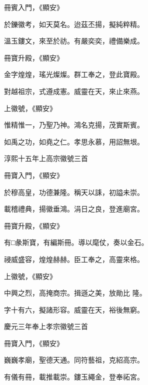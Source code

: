 \begin{pinyinscope}
 冊賓入門，《顯安》



 於鑠徽考，如天莫名。迨茲丕揚，擬純粹精。



 溫玉鏤文，來至於祊。有嚴奕奕，禮備樂成。



 冊寶升殿，《顯安》



 金字煌煌，瑤光燦燦。群工奉之，登此寶殿。



 對越祖宗，式遵成憲。威靈在天，來止來燕。



 上徽號，《顯安》



 惟精惟一，乃聖乃神。鴻名克揚，茂實斯賓。



 如禹之功，如堯之仁。孝思永慕，用詔無垠。



 淳熙十五年上高宗徽號三首



 冊寶入門，《顯安》



 於穆高皇，功德兼隆。稱天以誄，初謚未崇。



 載稽禮典，揚徽垂鴻。涓日之良，登進廟宮。



 冊寶升殿，《顯安》



 有□彖斯寶，有編斯冊。導以麾仗，奏以金石。



 祲威盛容，煌煌赫赫。臣工奉之，高靈來格。



 上徽號，《顯安》



 中興之烈，高掩商宗。揖遜之美，放勛比
 隆。



 字十有六，擬諸形容。威靈在天，裕後無窮。



 慶元三年奉上孝宗徽號三首



 冊寶入門，《顯安》



 巍巍孝廟，聖德天通。同符藝祖，克紹高宗。



 有儀有冊，載推載崇。鏤玉繩金，登奉祏宮。




\end{pinyinscope}
